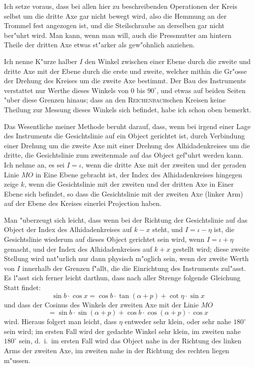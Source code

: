 \documentclass[12pt,a4paper]{article}
\begin{document}
Ich setze voraus, dass bei allen hier zu beschreibenden Operationen der Kreis selbst um die dritte
Axe gar nicht bewegt wird, also die Hemmung an der Trommel fest angezogen ist, und die Steilschraube
an derselben gar nicht ber"uhrt wird. Man kann, wenn man will, auch die Pressmutter am hintern Theile
der dritten Axe etwas st"arker als gew"ohnlich anziehen.

Ich nenne K"urze halber $I$ den Winkel zwischen einer Ebene durch die zweite und dritte Axe mit der
Ebene durch die erste und zweite, welcher mithin die Gr"osse der Drehung des Kreises um die zweite Axe
bestimmt. Der Bau des Instruments verstattet nur Werthe dieses Winkels von 0 bis $90^{\circ}$, und etwas auf
beiden Seiten "uber diese Grenzen hinaus; dass an den \textsc{Reichenbach}schen Kreisen keine Theilung zur Messung
dieses Winkels sich befindet, habe ich schon oben bemerkt.

Das Wesentliche meiner Methode beruht darauf, dass, wenn bei irgend einer Lage des Instruments
die Gesichtslinie auf ein Object gerichtet ist, durch Verbindung einer Drehung um die zweite Axe mit
einer Drehung des Alhidadenkreises um die dritte, die Gesichtslinie zum zweitenmale auf das Object
gef"uhrt werden kann. Ich nehme an, es sei $I = \iota$, wenn die dritte Axe mit der zweiten und der geraden
Linie $MO$ in Eine Ebene gebracht ist, der Index des Alhidadenkreises hingegen zeige $k$, wenn die
Gesichtslinie mit der zweiten und der dritten Axe in Einer Ebene sich befindet, so dass die Gesichtslinie
mit der zweiten Axe (linker Arm) auf der Ebene des Kreises einerlei Projection haben.

\newpage

Man "uberzeugt sich leicht, dass wenn bei der Richtung der Gesichtslinie auf das Object der Index des
Alhidadenkreises auf $k - x$ steht, und $I = \iota - \eta$ ist, die Gesichtslinie wiederum auf dieses Object gerichtet
sein wird, wenn $I = \iota + \eta$ gemacht, und der Index des Alhidadenkreises auf $k + x$ gestellt wird; diese
zweite Stellung wird nat"urlich nur dann physisch m"oglich sein, wenn der zweite Werth von $I$ innerhalb
der Grenzen f"allt, die die Einrichtung des Instruments zul"asst. Es l"asst sich ferner leicht darthun, dass
nach aller Strenge folgende Gleichung Statt findet:
\[\sin b \cdot \cos x = \cos b \cdot \tan(\alpha + p) + \cot \eta \cdot \sin x\]
und dass der Cosinus des Winkels der zweiten Axe mit der Linie $MO$
\[= \sin b \cdot \sin(\alpha + p) + \cos b \cdot \cos(\alpha + p) \cdot \cos x\]
wird. Hieraus folgert man leicht, dass $\eta$ entweder sehr klein, oder sehr nahe $180^{\circ}$ sein wird; im ersten
Fall wird der gedachte Winkel sehr klein, im zweiten nahe $180^{\circ}$ sein, d.~i.~im ersten Fall wird das Object
nahe in der Richtung des linken Arms der zweiten Axe, im zweiten nahe in der Richtung des rechten liegen m"ussen.
\end{document}
